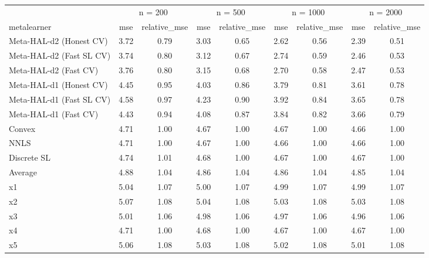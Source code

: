 
\begin{tabular}{lcccccccc}
\toprule
\multicolumn{1}{c}{ } & \multicolumn{2}{c}{n = 200} & \multicolumn{2}{c}{n = 500} & \multicolumn{2}{c}{n = 1000} & \multicolumn{2}{c}{n = 2000} \\
\cmidrule(l{3pt}r{3pt}){2-3} \cmidrule(l{3pt}r{3pt}){4-5} \cmidrule(l{3pt}r{3pt}){6-7} \cmidrule(l{3pt}r{3pt}){8-9}
metalearner & mse & relative\_mse & mse & relative\_mse & mse & relative\_mse & mse & relative\_mse\\
\midrule
Meta-HAL-d2 (Honest CV) & 3.72 & 0.79 & 3.03 & 0.65 & 2.62 & 0.56 & 2.39 & 0.51\\
Meta-HAL-d2 (Fast SL CV) & 3.74 & 0.80 & 3.12 & 0.67 & 2.74 & 0.59 & 2.46 & 0.53\\
Meta-HAL-d2 (Fast CV) & 3.76 & 0.80 & 3.15 & 0.68 & 2.70 & 0.58 & 2.47 & 0.53\\
Meta-HAL-d1 (Honest CV) & 4.45 & 0.95 & 4.03 & 0.86 & 3.79 & 0.81 & 3.61 & 0.78\\
Meta-HAL-d1 (Fast SL CV) & 4.58 & 0.97 & 4.23 & 0.90 & 3.92 & 0.84 & 3.65 & 0.78\\
Meta-HAL-d1 (Fast CV) & 4.43 & 0.94 & 4.08 & 0.87 & 3.84 & 0.82 & 3.66 & 0.79\\
Convex & 4.71 & 1.00 & 4.67 & 1.00 & 4.67 & 1.00 & 4.66 & 1.00\\
NNLS & 4.71 & 1.00 & 4.67 & 1.00 & 4.66 & 1.00 & 4.66 & 1.00\\
Discrete SL & 4.74 & 1.01 & 4.68 & 1.00 & 4.67 & 1.00 & 4.67 & 1.00\\
Average & 4.88 & 1.04 & 4.86 & 1.04 & 4.86 & 1.04 & 4.85 & 1.04\\
x1 & 5.04 & 1.07 & 5.00 & 1.07 & 4.99 & 1.07 & 4.99 & 1.07\\
x2 & 5.07 & 1.08 & 5.04 & 1.08 & 5.03 & 1.08 & 5.03 & 1.08\\
x3 & 5.01 & 1.06 & 4.98 & 1.06 & 4.97 & 1.06 & 4.96 & 1.06\\
x4 & 4.71 & 1.00 & 4.68 & 1.00 & 4.67 & 1.00 & 4.67 & 1.00\\
x5 & 5.06 & 1.08 & 5.03 & 1.08 & 5.02 & 1.08 & 5.01 & 1.08\\
\bottomrule
\end{tabular}
